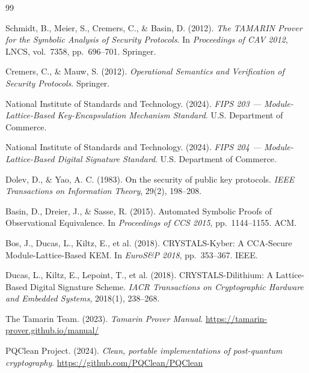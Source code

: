 \documentclass[12pt, a4paper, twoside, openright]{book}
\begin{document}

\begin{thebibliography}{99}

  Schmidt, B., Meier, S., Cremers, C., \& Basin, D. (2012).
  \textit{The TAMARIN Prover for the Symbolic Analysis of Security Protocols}.
  In \textit{Proceedings of CAV 2012}, LNCS, vol.~7358, pp.~696--701. Springer.

  Cremers, C., \& Mauw, S. (2012).
  \textit{Operational Semantics and Verification of Security Protocols}.
  Springer.

  National Institute of Standards and Technology. (2024).
  \textit{FIPS 203 --- Module-Lattice-Based Key-Encapsulation Mechanism Standard}.
  U.S. Department of Commerce.

  National Institute of Standards and Technology. (2024).
  \textit{FIPS 204 --- Module-Lattice-Based Digital Signature Standard}.
  U.S. Department of Commerce.

  Dolev, D., \& Yao, A. C. (1983).
  On the security of public key protocols.
  \textit{IEEE Transactions on Information Theory}, 29(2), 198--208.

  Basin, D., Dreier, J., \& Sasse, R. (2015).
  Automated Symbolic Proofs of Observational Equivalence.
  In \textit{Proceedings of CCS 2015}, pp.~1144--1155. ACM.

  Bos, J., Ducas, L., Kiltz, E., et al. (2018).
  CRYSTALS-Kyber: A CCA-Secure Module-Lattice-Based KEM.
  In \textit{EuroS\&P 2018}, pp.~353--367. IEEE.

  Ducas, L., Kiltz, E., Lepoint, T., et al. (2018).
  CRYSTALS-Dilithium: A Lattice-Based Digital Signature Scheme.
  \textit{IACR Transactions on Cryptographic Hardware and Embedded
  Systems}, 2018(1), 238--268.

  The Tamarin Team. (2023).
  \textit{Tamarin Prover Manual}.
  \url{https://tamarin-prover.github.io/manual/}

  PQClean Project. (2024).
  \textit{Clean, portable implementations of post-quantum cryptography}.
  \url{https://github.com/PQClean/PQClean}

\end{thebibliography}

\printindex
\end{document}
